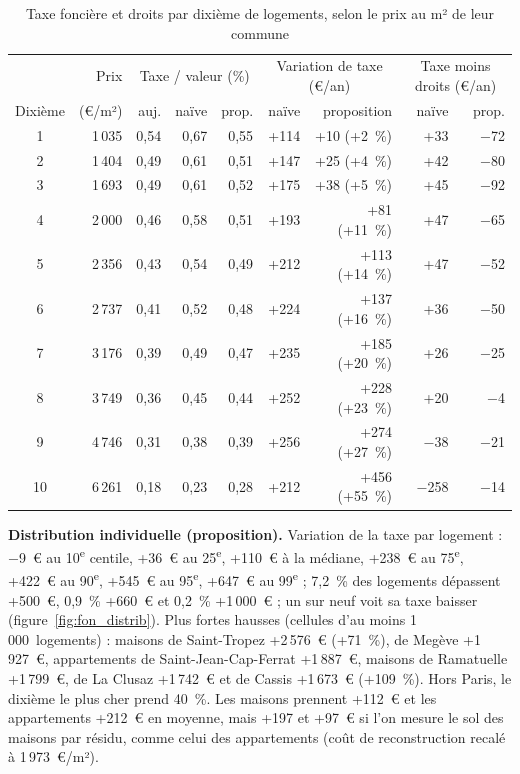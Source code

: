 \documentclass[11pt,a4paper]{article}
\begin{document}
\begin{table}[!htbp]\centering\scriptsize
\caption{Taxe foncière et droits par dixième de logements, selon le prix au m² de leur commune}\label{tab:fon_dec}
\begin{tabular*}{\linewidth}{@{\extracolsep{\fill}}c r *{3}{r} *{2}{r} *{2}{r}@{}}
\toprule
& Prix & \multicolumn{3}{c}{Taxe / valeur (\%)} & \multicolumn{2}{c}{Variation de taxe (€/an)} & \multicolumn{2}{c}{Taxe moins droits (€/an)} \\
\cmidrule(lr){3-5}\cmidrule(lr){6-7}\cmidrule(l){8-9}
Dixième & (€/m²) & auj. & naïve & prop. & naïve & proposition & naïve & prop. \\
\midrule
1 & 1\,035 & 0,54 & 0,67 & 0,55 & +114 & +10 (+2~\%) & +33 & $-$72 \\
2 & 1\,404 & 0,49 & 0,61 & 0,51 & +147 & +25 (+4~\%) & +42 & $-$80 \\
3 & 1\,693 & 0,49 & 0,61 & 0,52 & +175 & +38 (+5~\%) & +45 & $-$92 \\
4 & 2\,000 & 0,46 & 0,58 & 0,51 & +193 & +81 (+11~\%) & +47 & $-$65 \\
5 & 2\,356 & 0,43 & 0,54 & 0,49 & +212 & +113 (+14~\%) & +47 & $-$52 \\
6 & 2\,737 & 0,41 & 0,52 & 0,48 & +224 & +137 (+16~\%) & +36 & $-$50 \\
7 & 3\,176 & 0,39 & 0,49 & 0,47 & +235 & +185 (+20~\%) & +26 & $-$25 \\
8 & 3\,749 & 0,36 & 0,45 & 0,44 & +252 & +228 (+23~\%) & +20 & $-$4 \\
9 & 4\,746 & 0,31 & 0,38 & 0,39 & +256 & +274 (+27~\%) & $-$38 & $-$21 \\
10 & 6\,261 & 0,18 & 0,23 & 0,28 & +212 & +456 (+55~\%) & $-$258 & $-$14 \\
\bottomrule
\end{tabular*}
\par\vspace{2pt}{\raggedright\scriptsize Dixièmes de logements (et non de communes), classés selon le prix médian au m²
de leur commune. Taxe moins droits : baisse des droits rapportée à l'ensemble des logements de la commune. Sans réaction
des ventes.\par}
\end{table}

\textbf{Distribution individuelle (proposition).} Variation de la taxe par logement : $-$9~€ au 10\textsuperscript{e}
centile, +36~€ au 25\textsuperscript{e}, +110~€ à la médiane, +238~€ au 75\textsuperscript{e}, +422~€ au
90\textsuperscript{e}, +545~€ au 95\textsuperscript{e}, +647~€ au 99\textsuperscript{e} ; 7,2~\% des logements dépassent
+500~€, 0,9~\% +660~€ et 0,2~\% +1\,000~€ ; un sur neuf voit sa taxe baisser (figure~\ref{fig:fon_distrib}). Plus fortes hausses (cellules d'au moins
1\,000~logements) : maisons de Saint-Tropez +2\,576~€ (+71~\%), de Megève +1\,927~€, appartements de Saint-Jean-Cap-Ferrat
+1\,887~€, maisons de Ramatuelle +1\,799~€, de La Clusaz +1\,742~€ et de Cassis +1\,673~€ (+109~\%). Hors Paris, le
dixième le plus cher prend 40~\%. Les maisons prennent +112~€ et les appartements +212~€ en moyenne, mais +197 et +97~€
si l'on mesure le sol des maisons par résidu, comme celui des appartements (coût de reconstruction recalé à
1\,973~€/m²).
\end{document}
